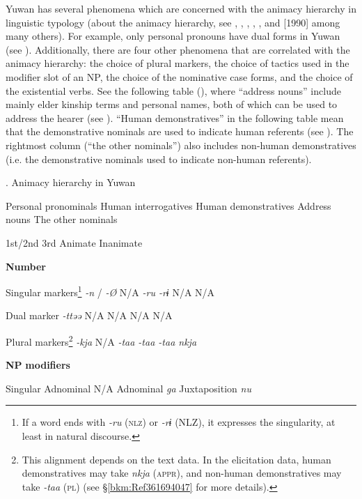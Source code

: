 Yuwan has several phenomena which are concerned with the animacy hierarchy in linguistic typology (about the animacy hierarchy, see \citealt{Silverstein1976}, \citealt{Comrie1989}, \citealt{Dixon1994}, \citealt{Whaley1997}, \citealt{Corbett2000}, and \citealt{Croft2003} [1990] among many others). For example, only personal pronouns have dual forms in Yuwan (see ). Additionally, there are four other phenomena that are correlated with the animacy hierarchy: the choice of plural markers, the choice of tactics used in the modifier slot of an NP, the choice of the nominative case forms, and the choice of the existential verbs. See the following table (), where “address nouns” include mainly elder kinship terms and personal names, both of which can be used to address the hearer (see ). “Human demonstratives” in the following table mean that the demonstrative nominals are used to indicate human referents (see ). The rightmost column (“the other nominals”) also includes non-human demonstratives (i.e. the demonstrative nominals used to indicate non-human referents).

\begin{styleBeschriftung}
\textmd{}\textmd{. Animacy hierarchy in Yuwan}
\end{styleBeschriftung}

  Personal pronominals  Human interrogatives  Human demonstratives  Address nouns  The other nominals

  1st/2nd  3rd        Animate  Inanimate

\textbf{Number}          

Singular markers\footnote{If a word ends with \textit{{}-ru} (\textsc{nlz}) or \textit{{}-rɨ} (NLZ), it expresses the singularity, at least in natural discourse.}  \textit{{}-n} / \textit{-Ø}  N/A  \textit{{}-ru  {}-rɨ} N/A  N/A

Dual marker     \textit{{}-ttəə} N/A  N/A  N/A  N/A

Plural markers\footnote{This alignment depends on the text data. In the elicitation data, human demonstratives may take \textit{nkja} (\textsc{appr}), and non-human demonstratives may take \textit{{}-taa} (\textsc{pl}) (see §\ref{bkm:Ref361694047} for more details).}  \textit{{}-kja} N/A  \textit{{}-taa  {}-taa  {}-taa  nkja}

\textbf{NP} \textbf{modifiers}          

Singular  Adnominal  N/A  Adnominal  \textit{ga}  Juxtaposition  \textit{nu}

